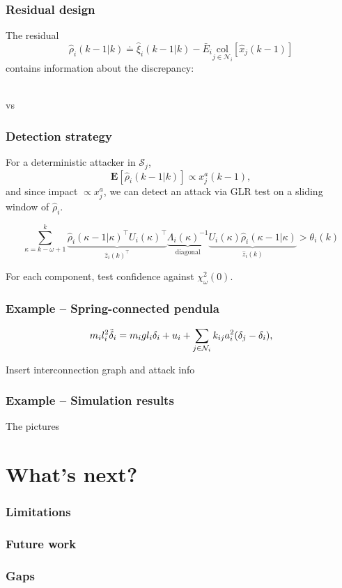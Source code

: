 \documentclass[presentation]{beamer}
\newcommand{\NN}{{\mathcal{N}}}
\newcommand{\mean}[1]{\mathbf{E}\left[#1\right]}
\newcommand{\col}[1]{\underset{{#1}}{\mathrm{col}}}
\begin{document}
\begin{frame}
	\frametitle{Residual design}
	The residual
	$$
	\hat \rho_i(k-1|k) \doteq  \hat \xi_i(k-1|k) - \bar{E}_i \col{j\in\NN_i}[\hat x_j(k-1)]
	$$
	contains information about the discrepancy: \\[3ex]
	\centering

	 \\[2ex]
	vs \\[2ex]
\end{frame}

\begin{frame}
	\frametitle{Detection strategy}

	For a deterministic attacker in $\mathcal S_j$, $$\mean{\hat \rho_i(k-1|k)} \propto x_j^a(k-1), $$ and since impact $\propto x_j^a$, we can detect an attack via GLR test on a sliding window of $\hat \rho_i$.

	$$
	\sum_{\kappa = k-\omega+1}^{k} 
	\underbrace{\hat \rho_i(\kappa-1|\kappa)^\top U_i(\kappa)^\top}_{\hat z_i(k)^\top} 
	\underbrace{\Lambda_i(\kappa)^{-1}}_{\text{diagonal}} 
	\underbrace{U_i(\kappa)\hat \rho_i(\kappa-1|\kappa)}_{\hat z_i(k)} > \theta_i(k)
	$$

	For each component, test confidence against $\chi^2_\omega(0)$.
\end{frame}

\begin{frame}
	\frametitle{Example -- Spring-connected pendula}

	\begin{equation*}
		m_il_i^2\Ddot{\delta}_i = m_igl_i\delta_i + u_i + \sum_{j\in\NN_i} k_{ij}a_i^2(\delta_j-\delta_i),
	\end{equation*}

	Insert interconnection graph and attack info
\end{frame}

\begin{frame}
	\frametitle{Example -- Simulation results}

	The pictures
\end{frame}

\section{What's next?}

\begin{frame}
	\frametitle{Limitations}

\end{frame}

\begin{frame}
	\frametitle{Future work}

\end{frame}

\begin{frame}
	\frametitle{Gaps}

\end{frame}
 
\end{document}
